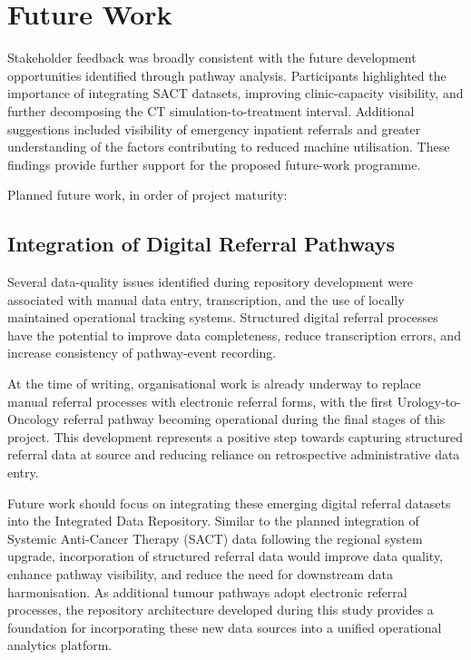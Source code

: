 \section{Future Work}

Stakeholder feedback was broadly consistent with the future development opportunities identified through pathway analysis. Participants highlighted the importance of integrating SACT datasets, improving clinic-capacity visibility, and further decomposing the CT simulation-to-treatment interval. Additional suggestions included visibility of emergency inpatient referrals and greater understanding of the factors contributing to reduced machine utilisation. These findings provide further support for the proposed future-work programme.

Planned future work, in order of project maturity:

\subsection{Integration of Digital Referral Pathways}

Several data-quality issues identified during repository development were associated with manual data entry, transcription, and the use of locally maintained operational tracking systems. Structured digital referral processes have the potential to improve data completeness, reduce transcription errors, and increase consistency of pathway-event recording. 

At the time of writing, organisational work is already underway to replace manual referral processes with electronic referral forms, with the first Urology-to-Oncology referral pathway becoming operational during the final stages of this project. This development represents a positive step towards capturing structured referral data at source and reducing reliance on retrospective administrative data entry. 

Future work should focus on integrating these emerging digital referral datasets into the Integrated Data Repository. Similar to the planned integration of Systemic Anti-Cancer Therapy (SACT) data following the regional system upgrade, incorporation of structured referral data would improve data quality, enhance pathway visibility, and reduce the need for downstream data harmonisation. As additional tumour pathways adopt electronic referral processes, the repository architecture developed during this study provides a foundation for incorporating these new data sources into a unified operational analytics platform.

